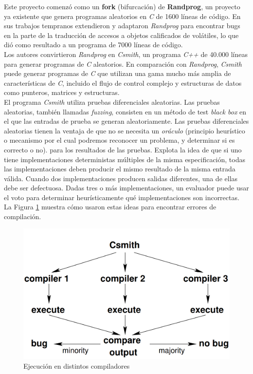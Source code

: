 Este proyecto comenzó como un \textbf{fork} (bifurcación) de \textbf{Randprog}\cite{randprog}, un proyecto ya existente que genera programas aleatorios en \textit{C} de 1600 líneas de código. En sus trabajos tempranos extendieron y adaptaron \textit{Randprog} para encontrar bugs en la parte de la traducción de accesos a objetos calificados de volátiles, lo que dió como resultado a un programa de 7000 líneas de código. \\

Los autores convirtieron \textit{Randprog} en \textit{Csmith}, un programa \textit{C++} de 40.000 líneas para generar programas de \textit{C} aleatorios. En comparación con \textit{Randprog}, \textit{Csmith} puede generar programas de \textit{C} que utilizan una gama mucho más amplia de características de \textit{C}, incluido el flujo de control complejo y estructuras de datos como punteros, matrices y estructuras.\\

El programa \textit{Csmith} utiliza pruebas diferenciales aleatorias. Las pruebas aleatorias\cite{pinho2006reliable}, también llamadas \textit{fuzzing}\cite{Miller:1990:ESR:96267.96279}, consisten en un método de test \textit{black box} en el que las entradas de prueba se generan aleatoriamente. Las pruebas diferenciales aleatorias\cite{McKeeman98differentialtesting} tienen la ventaja de que no se necesita un \textit{oráculo} (principio heurístico o mecanismo por el cual podremos reconocer un problema, y determinar si es correcto o no). para los resultados de las pruebas. Explota la idea de que si uno tiene implementaciones deterministas múltiples de la misma especificación, todas las implementaciones deben producir el mismo resultado de la misma entrada válida. Cuando dos implementaciones producen salidas diferentes, una de ellas debe ser defectuosa. Dadas tres o más implementaciones, un evaluador puede usar el voto para determinar heurísticamente qué implementaciones son incorrectas. La Figura \ref{fig:csmith compilers} muestra cómo usaron estas ideas para encontrar errores de compilación.\\

\begin{figure}[ht]
    \centering
    \includegraphics[scale=0.3]{images/csmith1.png}
    \caption{Ejecución en distintos compiladores}
    \label{fig:csmith compilers}
\end{figure}

